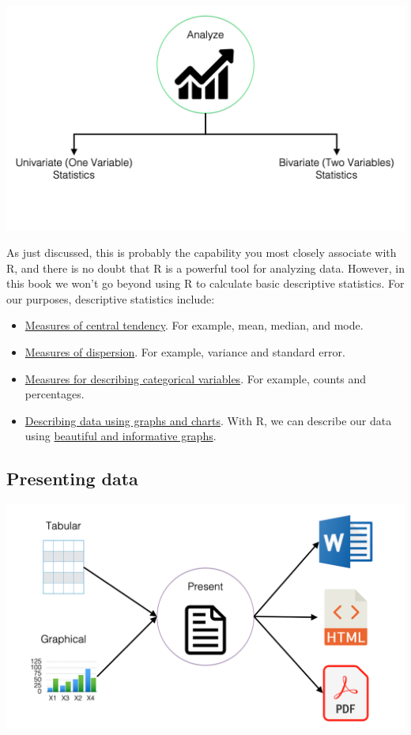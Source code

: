 \documentclass[
  letterpaper,
  DIV=11,
  numbers=noendperiod]{scrreprt}
\providecommand{\tightlist}{%
  \setlength{\itemsep}{0pt}\setlength{\parskip}{0pt}}\usepackage{longtable,booktabs,array}
\begin{document}
\includegraphics{chapters/what_is_r/competencies_analysis.png}

As just discussed, this is probably the capability you most closely
associate with R, and there is no doubt that R is a powerful tool for
analyzing data. However, in this book we won't go beyond using R to
calculate basic descriptive statistics. For our purposes, descriptive
statistics include:

\begin{itemize}
\tightlist
\item
  \ul{Measures of central tendency}. For example, mean, median, and
  mode.\\
\item
  \ul{Measures of dispersion}. For example, variance and standard
  error.\\
\item
  \ul{Measures for describing categorical variables}. For example,
  counts and percentages.\\
\item
  \ul{Describing data using graphs and charts}. With R, we can describe
  our data using \href{https://www.r-graph-gallery.com/}{beautiful and
  informative graphs}.
\end{itemize}

\subsection{Presenting data}\label{presenting-data}

\includegraphics{chapters/what_is_r/competencies_present.png}
\end{document}
